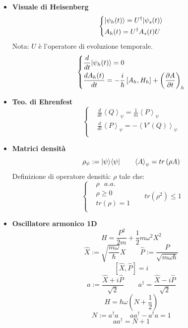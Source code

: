 \documentclass{article}
\DeclarePairedDelimiter\bra{\langle}{\rvert}
\DeclarePairedDelimiter\ket{\lvert}{\rangle}
\begin{document}
\begin{footnotesize}
\begin{multicols*}{3}
\begin{itemize}[leftmargin=*]
\begin{itemize}
				
		\end{itemize}
	\item \textbf{Visuale di Heisenberg}
		\[
			\left\{\begin{aligned}
				&\ket*{\psi _h(t)} = U^\dag \ket*{\psi _s(t)} \\
				&A_h(t) = U^\dag A_s(t) U\\
			\end{aligned}\right.
		\]
		Nota: $U$ è l'operatore di evoluzione temporale.
		\[
			\left\{\begin{aligned}
				&\frac{d}{dt}\ket*{\psi _h(t)} = 0 \\
				&\frac{dA_h(t)}{dt} = -\frac{i}{\hbar }\left[A_h, H_h\right] + \left(\frac{\partial A}{\partial t}\right)_h\\
			\end{aligned}\right.
		\]
	\item \textbf{Teo. di Ehrenfest}
		\[
			\left\{\begin{aligned}
				&\frac{d}{dt}\left< Q\right>_\psi = \frac{1}{m} \left< P\right>_\psi \\
				&\frac{d}{dt}\left< P\right>_\psi = -\left< V'(Q)\right>_\psi \\ 
			\end{aligned}\right.
		\]
	\item \textbf{Matrici densità}
		\[\rho _\psi := \ket*{\psi }\bra*{\psi }%
		\hspace{20pt} \left< A\right>_\psi = tr\left(\rho A\right)\]
		Definizione di operatore densità: $\rho $ tale che:
		\[
			\left\{\begin{aligned}
				&\rho \ \ \  a.a.\\
				&\rho \geq 0\\
				&tr (\rho) =1\\
			\end{aligned}\right.
		\hspace{20pt} tr(\rho ^2)\leq 1\]
	\item \textbf{Oscillatore armonico 1D}
		\[H=\frac{P^2}{2m} + \frac{1}{2}m\omega ^2X^2\]
		\[\widehat{X}:=\sqrt{\frac{m\omega }{\hbar }}X \hspace{25pt} \widehat{P}:=\frac{P}{\sqrt{m\omega \hbar }}\]
		\[\left[\widehat{X}, \widehat{P}\right] = i\]
		\[a := \frac{\widehat{X}+i\widehat{P}}{\sqrt{2}} \hspace{25pt} a^\dag = \frac{\widehat{X}-i\widehat{P}}{\sqrt{2}}\]
		\[H = \hbar \omega \left(N+\frac{1}{2}\right)\]
		\[N:=a^\dag a\hspace{20pt} aa^\dag - a^\dag a = 1 \]\[ aa^\dag=N+1\]

\end{itemize}
\end{multicols*}
\end{footnotesize}
\end{document}
